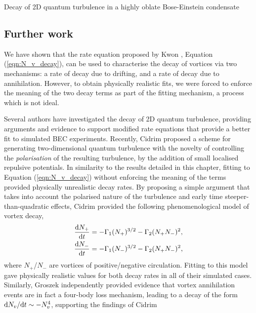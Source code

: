 \begin{chapter}{\label{cha:shin}Decay of 2D quantum turbulence in a highly oblate Bose-Einstein condensate}
\subsection{Further work}
We have shown that the rate equation proposed by Kwon \etal \citep{kwon_moon_14}, Equation (\ref{eqn:N_v_decay}), can be used to characterise the decay of vortices via two mechanisms: a rate of decay due to drifting, and a rate of decay due to annihilation. However, to obtain physically realistic fits, we were forced to enforce the meaning of the two decay terms as part of the fitting mechanism, a process which is not ideal.%

Several authors \cite{Cidrim15,Groszek15} have investigated the decay of 2D quantum turbulence, providing arguments and evidence to support modified rate equations that provide a better fit to simulated BEC experiments. Recently, Cidrim \etal \cite{Cidrim15} proposed a scheme for generating two-dimensional quantum turbulence with the novelty of controlling the {\it polarisation} of the resulting turbulence, by the addition of small localised repulsive potentials. In similarity to the results detailed in this chapter, fitting to Equation (\ref{eqn:N_v_decay}) without enforcing the meaning of the terms provided physically unrealistic decay rates. By proposing a simple argument that takes into account the polarised nature of the turbulence and early time steeper-than-quadratic effects, Cidrim \etal provided the following phenomenological model of vortex decay,
\begin{align}
  \frac{{\rm d}N_+}{{\rm d}t} &= -\Gamma_1(N_+)^{3/2} -\Gamma_2(N_+N_-)^2,\\
  \frac{{\rm d}N_-}{{\rm d}t} &= -\Gamma_1(N_-)^{3/2} -\Gamma_2(N_+N_-)^2,
\end{align}
where $N_+$/$N_-$ are vortices of positive/negative circulation. Fitting to this model gave physically realistic values for both decay rates in all of their simulated cases. Similarly, Groszek \etal independently provided evidence \cite{Groszek15} that vortex annihilation events are in fact a four-body loss mechanism, leading to a decay of the form ${{\rm d}N_v}/{{\rm d}t}\sim -N_v^4$, supporting the findings of Cidrim \etal
\end{chapter}
